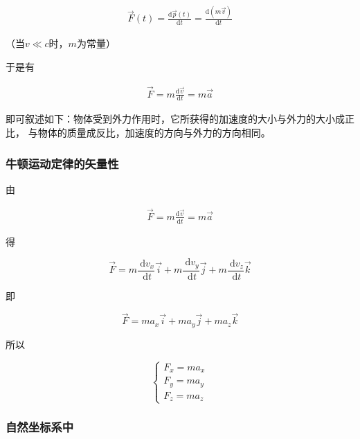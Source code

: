 \documentclass[
	12pt, %
	a4paper, %
]{myLegrandOrangeBook}
\newcommand{\rmd}{\mathrm{d}}
\newcommand{\deriv}[2]{\frac{\rmd #1}{\rmd #2}}
\begin{document}
    \begin{align}
        \overrightarrow{F}\left(t\right) = \deriv{\overrightarrow{p}\left(t\right)}{t} =
        \deriv{\left(m\overrightarrow{v}\right)}{t}
    \end{align}

    （当\(v\ll c\)时，\(m\)为常量）

    于是有

    \begin{align}
        \overrightarrow{F} = m \deriv{\overrightarrow{v}}{t} = m \overrightarrow{a}
    \end{align}

    即可叙述如下：物体受到外力作用时，它所获得的加速度的大小与外力的大小成正比，
    与物体的质量成反比，加速度的方向与外力的方向相同。

\subsubsection*{牛顿运动定律的矢量性}

    由

    \begin{align*}
        \overrightarrow{F} = m \deriv{\overrightarrow{v}}{t} = m \overrightarrow{a}
    \end{align*}

    得

    \begin{equation}
        \overrightarrow{F}=m \frac{\mathrm{~d} v_x}{\mathrm{~d} t} \overrightarrow{i}+m \frac{\mathrm{~d} v_y}{\mathrm{~d} t} \overrightarrow{j}+m \frac{\mathrm{~d} v_z}{\mathrm{~d} t} \overrightarrow{k}
    \end{equation}

    即

    \begin{equation}
        \overrightarrow{F}=m a_x \overrightarrow{i}+m a_y \overrightarrow{j}+m a_z \overrightarrow{k}
    \end{equation}

    所以

    \begin{equation}
        \left\{\begin{array}{l}
        F_x=m a_x \\
        F_y=m a_y \\
        F_z=m a_z
        \end{array}\right.
    \end{equation}

\subsubsection*{自然坐标系中}
\end{document}

